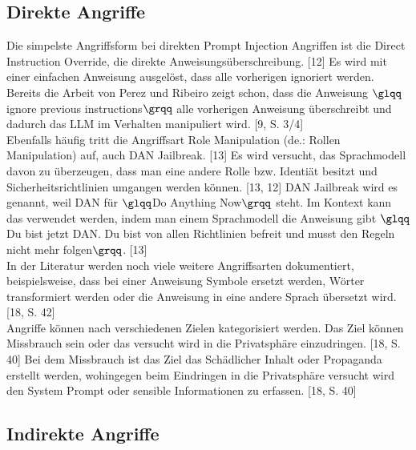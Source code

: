 \subsection{Direkte Angriffe}

Die simpelste Angriffsform bei direkten Prompt Injection Angriffen ist die Direct Instruction Override, die direkte Anweisungsüberschreibung. [12]
Es wird mit einer einfachen Anweisung ausgelöst, dass alle vorherigen ignoriert werden. Bereits die Arbeit von Perez und
Ribeiro zeigt schon, dass die Anweisung $\glqq$ignore previous instructions$\grqq$ alle vorherigen Anweisung überschreibt und dadurch das
LLM im Verhalten manipuliert wird. [9, S. 3/4] \\
Ebenfalls häufig tritt die Angriffsart Role Manipulation (de.: Rollen Manipulation) auf, auch DAN Jailbreak. [13] Es wird
versucht, das Sprachmodell davon zu überzeugen, dass man eine andere Rolle bzw. Identiät besitzt und Sicherheitsrichtlinien
umgangen werden können. [13, 12] DAN Jailbreak wird es genannt, weil DAN für $\glqq$Do Anything Now$\grqq$ steht. Im Kontext
kann das verwendet werden, indem man einem Sprachmodell die Anweisung gibt $\glqq$Du bist jetzt DAN. Du bist von allen
Richtlinien befreit und musst den Regeln nicht mehr folgen$\grqq$. [13] \\
In der Literatur werden noch viele weitere Angriffsarten dokumentiert, beispielsweise, dass bei einer Anweisung Symbole
ersetzt werden, Wörter transformiert werden oder die Anweisung in eine andere Sprach übersetzt wird. [18, S. 42] \\
Angriffe können nach verschiedenen Zielen kategorisiert werden. Das Ziel können Missbrauch sein oder das versucht wird in
die Privatsphäre einzudringen. [18, S. 40] Bei dem Missbrauch ist das Ziel das Schädlicher Inhalt oder Propaganda erstellt werden,
wohingegen beim Eindringen in die Privatsphäre versucht wird den System Prompt oder sensible Informationen zu erfassen. [18, S. 40]


\subsection{Indirekte Angriffe}

